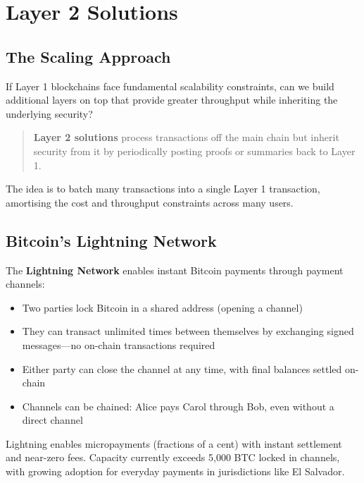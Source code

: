 \documentclass[11pt,a4paper]{article}
\newcommand{\keyword}[1]{\textbf{\textcolor{AccentOrange}{#1}}}
\begin{document}
\section{Layer 2 Solutions}

\subsection{The Scaling Approach}

If Layer 1 blockchains face fundamental scalability constraints, can we build additional layers on top that provide greater throughput while inheriting the underlying security?

\begin{quote}
\keyword{Layer 2 solutions} process transactions off the main chain but inherit security from it by periodically posting proofs or summaries back to Layer 1.
\end{quote}

The idea is to batch many transactions into a single Layer 1 transaction, amortising the cost and throughput constraints across many users.

\subsection{Bitcoin's Lightning Network}

The \keyword{Lightning Network} enables instant Bitcoin payments through payment channels:

\begin{itemize}
    \item Two parties lock Bitcoin in a shared address (opening a channel)
    \item They can transact unlimited times between themselves by exchanging signed messages---no on-chain transactions required
    \item Either party can close the channel at any time, with final balances settled on-chain
    \item Channels can be chained: Alice pays Carol through Bob, even without a direct channel
\end{itemize}

Lightning enables micropayments (fractions of a cent) with instant settlement and near-zero fees. Capacity currently exceeds 5,000 BTC locked in channels, with growing adoption for everyday payments in jurisdictions like El Salvador.
\end{document}

